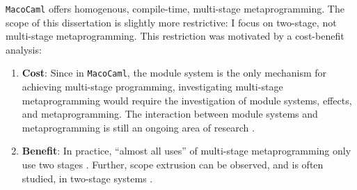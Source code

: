 \texttt{MacoCaml} offers homogenous, compile-time, multi-stage metaprogramming. The scope of this dissertation is slightly more restrictive: I focus on two-stage, not multi-stage metaprogramming. This restriction was motivated by a cost-benefit analysis:
\begin{enumerate}
  \item \textbf{Cost}: Since in \texttt{MacoCaml}, the module system is the only mechanism for achieving multi-stage programming, investigating multi-stage metaprogramming would require the investigation of module systems, effects, and metaprogramming. The interaction between module systems and metaprogramming is still an ongoing area of research \citep{chiang-2024}.
  \item \textbf{Benefit}: In practice, ``almost all uses'' of multi-stage metaprogramming only use two stages \citep{inoue-2012}. Further, scope extrusion can be observed, and is often studied, in two-stage systems \citep{isoda-24,kiselyov-16}.
\end{enumerate}